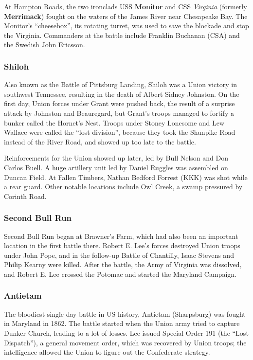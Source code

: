 At Hampton Roads, the two ironclads USS \textbf{Monitor} and CSS \textit{Virginia} (formerly \textbf{Merrimack})
fought on the waters of the James River near Chesapeake Bay.
The Monitor's ``cheesebox'', its rotating turret, was used to save the blockade and stop the Virginia.
Commanders at the battle include Franklin Buchanan (CSA) and the Swedish John Ericsson.

\subsubsection*{Shiloh}

Also known as the Battle of Pittsburg Landing, Shiloh was a Union victory in southwest Tennessee,
resulting in the death of Albert Sidney Johnston.
On the first day, Union forces under Grant were pushed back,
the result of a surprise attack by Johnston and Beauregard,
but Grant's troops managed to fortify a bunker called the Hornet's Nest.
Troops under Stoney Lonesome and Lew Wallace were called the ``lost division'',
because they took the Shunpike Road instead of the River Road,
and showed up too late to the battle.

Reinforcements for the Union showed up later, led by Bull Nelson and Don Carlos Buell.
A huge artillery unit led by Daniel Ruggles was assembled on Duncan Field.
At Fallen Timbers, Nathan Bedford Forrest (KKK) was shot while a rear guard.
Other notable locations include Owl Creek, a swamp pressured by Corinth Road.

\subsubsection*{Second Bull Run}

Second Bull Run began at Brawner's Farm, which had also been an important location in the first battle there.
Robert E. Lee's forces destroyed Union troops under John Pope,
and in the follow-up Battle of Chantilly, Isaac Stevens and Philip Kearny were killed.
After the battle, the Army of Virginia was dissolved,
and Robert E. Lee crossed the Potomac and started the Maryland Campaign.

\subsubsection*{Antietam}

The bloodiest single day battle in US history, Antietam (Sharpsburg) was fought in Maryland in 1862.
The battle started when the Union army tried to capture Dunker Church, leading to a lot of losses.
Lee issued Special Order 191 (the ``Lost Dispatch''),
a general movement order, which was recovered by Union troops;
the intelligence allowed the Union to figure out the Confederate strategy.

